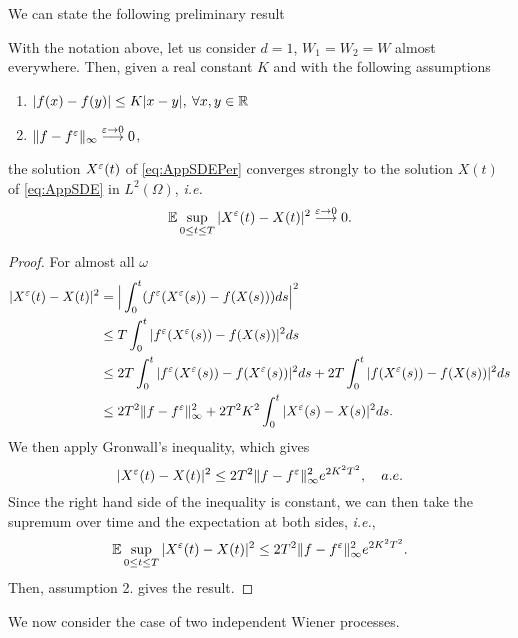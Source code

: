 We can state the following preliminary result
\begin{lemma}\label{lem:Lemma1} With the notation above, let us consider $d = 1$, $W_1 = W_2 = W$ almost everywhere. Then, given a real constant $K$ and with the following assumptions
\begin{enumerate}
	\item $|f(x) - f(y)| \leq K|x - y|, \: \forall x,y \in \mathbb{R}$
 	\item $\|f - f^\varepsilon\|_{\infty} \stackrel{\varepsilon \rightarrow 0}\longrightarrow 0$,
\end{enumerate}
the solution $X^\varepsilon(t)$ of \eqref{eq:AppSDEPer} converges strongly to the solution $X(t)$ of \eqref{eq:AppSDE} in $L^2(\Omega)$, \textit{i.e.}
\begin{equation*}
	\mathbb{E} \sup_{0 \leq t \leq T} |X^\varepsilon(t) - X(t)|^2 \stackrel{\varepsilon \rightarrow 0}\longrightarrow 0.
\end{equation*}
\end{lemma}

\begin{proof}
For almost all $\omega$
\begin{equation*}
\begin{aligned}
	|X^\varepsilon(t) - X(t)|^2  &= \Big|\int_0^t (f^\varepsilon (X^\varepsilon(s)) - f(X(s)))ds \Big|^2 \\
	&\leq T \int_0^t |f^\varepsilon (X^\varepsilon(s)) - f(X(s))|^2 ds  \\
	&\leq 2T \int_0^t |f^\varepsilon (X^\varepsilon(s)) - f(X^\varepsilon(s))|^2 ds + 2T \int_0^t |f (X^\varepsilon(s)) - f(X(s))|^2 ds \\
	&\leq 2T^2 \|f - f^\varepsilon\|_{\infty}^2 + 2T^2K^2 \int_0^t |X^\varepsilon(s) - X(s)|^2ds.
\end{aligned} 
\end{equation*}
We then apply Gronwall's inequality, which gives 
\begin{equation}\label{eq:TheoryEpsilon}
	|X^\varepsilon(t) - X(t)|^2 \leq  2T^2 \|f - f^\varepsilon\|_{\infty}^2 e^{2K^2T^2}, \quad a.e.
\end{equation}
Since the right hand side of the inequality is constant, we can then take the supremum over time and the expectation at both sides, \textit{i.e.},
\begin{equation*}
	\mathbb{E} \sup_{0 \leq t \leq T} |X^\varepsilon(t) - X(t)|^2 \leq  2T^2 \|f - f^\varepsilon\|_{\infty}^2 e^{2K^2T^2}.
\end{equation*}
Then, assumption 2. gives the result.
\end{proof}
\noindent We now consider the case of two independent Wiener processes.

